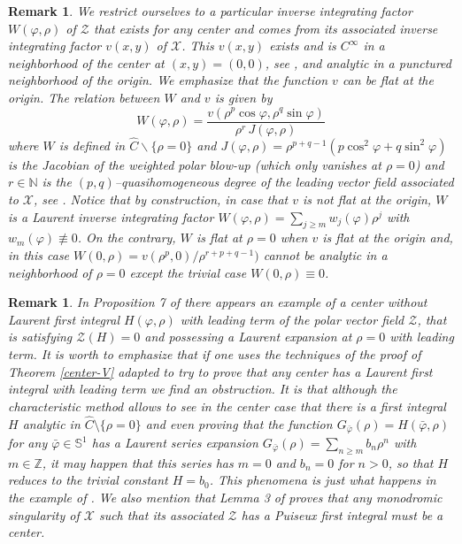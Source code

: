 \documentclass[12pt]{amsart}
\newtheorem {remark} [theorem]{\sc Remark}
\begin{document}
\begin{remark}
{\rm We restrict ourselves to a particular inverse integrating factor $W(\varphi, \rho)$ of $\mathcal{Z}$ that exists for any center and comes from its associated inverse integrating factor $v(x,y)$ of $\mathcal{X}$. This $v(x,y)$ exists and is $C^\infty$ in a neighborhood of the center at $(x,y)=(0,0)$, see \cite{GP}, and analytic in a punctured neighborhood of the origin. We emphasize that the function $v$ can be flat at the origin. The relation between $W$ and $v$ is given by
\begin{equation}\label{V-polar-def}
W(\varphi, \rho) = \frac{v(\rho^p \cos\varphi, \rho^q \sin\varphi)}{\rho^{r} \, J(\varphi, \rho)}
\end{equation}
where $W$ is defined in $\hat{C} \backslash \{\rho=0\}$ and $J(\varphi, \rho) = \rho^{p+q-1}(p \cos^2\varphi + q \sin^2\varphi)$ is the Jacobian of the weighted polar blow-up (which only vanishes at $\rho=0$) and $r \in \mathbb{N}$ is the $(p,q)$--quasihomogeneous degree of the leading vector field associated to $\mathcal{X}$, see \cite{GaGi3}. Notice that by construction, in case that $v$ is not flat at the origin, $W$ is a Laurent inverse integrating factor $W(\varphi, \rho) = \sum_{j \geq m} w_j(\varphi) \rho^{j}$ with $w_m(\varphi) \not\equiv 0$. On the contrary, $W$ is flat at $\rho=0$ when $v$ is flat at the origin and, in this case $W(0, \rho) = v(\rho^p, 0) / \rho^{r+p+q-1})$ cannot be analytic in a neighborhood of $\rho=0$ except the trivial case $W(0, \rho) \equiv 0$.  }
\end{remark}

\begin{remark}
{\rm In Proposition 7 of \cite{GGR} there appears an example of a center without Laurent first integral $H(\varphi, \rho)$ with leading term of the polar vector field $\mathcal{Z}$, that is satisfying $\mathcal{Z}(H) = 0$ and possessing a Laurent expansion at $\rho=0$ with leading term. It is worth to emphasize that if one uses the techniques of the proof of Theorem \ref{center-V} adapted to try to prove that any center has a Laurent first integral with leading term we find an obstruction. It is that although the characteristic method allows to see in the center case that there is a first integral $H$ analytic in $\hat{C} \setminus \{ \rho=0 \}$ and even proving that the function $G_{\bar{\varphi}}(\rho) = H(\bar{\varphi}, \rho)$ for any $\bar{\varphi} \in \mathbb{S}^1$ has a Laurent series expansion $G_{\bar{\varphi}}(\rho) = \sum_{n \geq m} b_n \rho^n$ with $m \in \mathbb{Z}$, it may happen that this series has $m=0$ and $b_n = 0$ for $n > 0$, so that $H$ reduces to the trivial constant $H=b_0$. This phenomena is just what happens in the example of \cite{GGR}. We also mention that Lemma 3 of \cite{GGR} proves that any monodromic singularity of $\mathcal{X}$ such that its associated $\mathcal{Z}$ has a Puiseux first integral must be a center. }
\end{remark}
\end{document}
